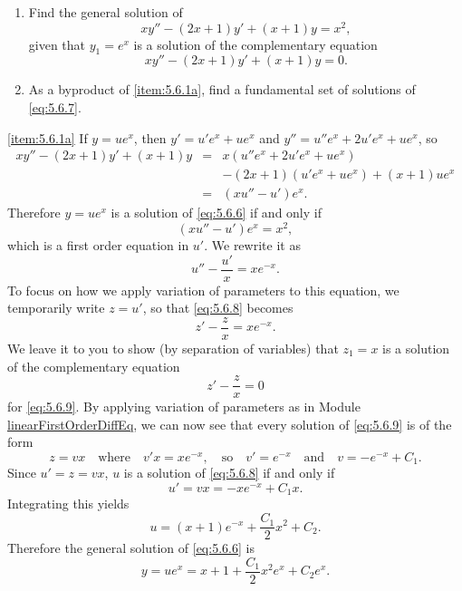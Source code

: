 \documentclass{ximera}
\begin{document}
\begin{example}\label{example:5.6.1}
\begin{enumerate}
\item \label{item:5.6.1a} %
 Find the general solution of
\begin{equation} \label{eq:5.6.6}
xy''-(2x+1)y'+(x+1)y=x^2,
\end{equation}
given that $y_1=e^x$ is a solution of the complementary equation
\begin{equation} \label{eq:5.6.7}
xy''-(2x+1)y'+(x+1)y=0.
\end{equation}
\item \label{item:5.6.1b}%
As a byproduct of \ref{item:5.6.1a}, find a fundamental set of solutions of
\eqref{eq:5.6.7}.
\end{enumerate}
 
\begin{explanation} \ref{item:5.6.1a}
If
$y=ue^x$, then $y'=u'e^x+ue^x$ and
$y''=u''e^x+2u'e^x+ue^x$, so
\begin{eqnarray*}
xy''-(2x+1)y'+(x+1)y&=&x(u''e^x+2u'e^x+ue^x)\\
&&-(2x+1)(u'e^x+ue^x)+(x+1)ue^x\\
&=&(xu''-u')e^x.
\end{eqnarray*}
Therefore $y=ue^x$ is a solution of \eqref{eq:5.6.6} if and only if
$$
(xu''-u')e^x=x^2,
$$
which is a first order equation in $u'$. We rewrite it as
\begin{equation} \label{eq:5.6.8}
u''-\frac{u'}{x}=xe^{-x}.
\end{equation}
To focus on how we apply variation of parameters to this equation, we
temporarily write $z=u'$, so that \eqref{eq:5.6.8} becomes
\begin{equation} \label{eq:5.6.9}
z'-\frac{z}{x}=xe^{-x}.
\end{equation}
We leave it to you to show (by separation of variables) that $z_1=x$
is a solution of the complementary equation
$$
z'-\frac{z}{x}=0
$$
for \eqref{eq:5.6.9}. By applying variation of parameters as in
Module \href{https://ximera.osu.edu/ode/main/linearFirstOrderDiffEq/linearFirstOrderDiffEq}{linearFirstOrderDiffEq}, we can now see that every solution of
\eqref{eq:5.6.9} is of the form
$$
z=vx\quad\mbox{where}\quad
v'x=xe^{-x}, \quad\mbox{so}\quad v'=e^{-x} \quad\mbox{and}\quad
v=-e^{-x}+C_1.
$$
Since $u'=z=vx$,   $u$ is a solution of \eqref{eq:5.6.8} if and only if
$$
u'=vx=-xe^{-x}+C_1x.
$$
Integrating this yields
$$
u=(x+1)e^{-x}+\frac{C_1}{2}x^2+C_2.
$$
Therefore the general solution of  \eqref{eq:5.6.6} is
\begin{equation} \label{eq:5.6.10}
y=ue^x=x+1+\frac{C_1}{2}x^2e^x+C_2e^x.
\end{equation}
 

\end{explanation}
\end{example}
\end{document}
